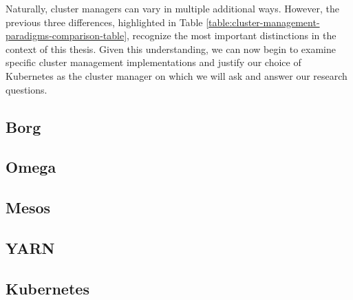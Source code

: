 Naturally, cluster managers can vary in multiple additional ways. However,
the previous three differences, highlighted in
Table \ref{table:cluster-management-paradigms-comparison-table}, recognize the most
important distinctions in
the context of this thesis. Given this understanding, we can now begin to examine specific
cluster management implementations and justify our choice of Kubernetes as the
cluster manager on which we will ask and answer our research questions.

\subsection{Borg}



\subsection{Omega}





\subsection{Mesos}



\subsection{YARN}



\subsection{Kubernetes}


